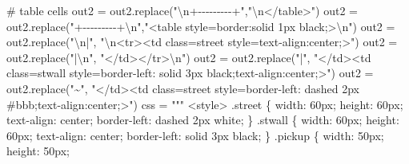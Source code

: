 \documentclass[
  letterpaper,
]{scrbook}
\newenvironment{Shaded}{\begin{snugshade}}{\end{snugshade}}
\newcommand{\CharTok}[1]{\textcolor[rgb]{0.13,0.47,0.30}{#1}}
\newcommand{\CommentTok}[1]{\textcolor[rgb]{0.37,0.37,0.37}{#1}}
\newcommand{\NormalTok}[1]{\textcolor[rgb]{0.00,0.23,0.31}{#1}}
\newcommand{\OperatorTok}[1]{\textcolor[rgb]{0.37,0.37,0.37}{#1}}
\newcommand{\StringTok}[1]{\textcolor[rgb]{0.13,0.47,0.30}{#1}}
\begin{document}
\begin{Shaded}
\begin{Highlighting}[]
    
    \CommentTok{\# table cells}
\NormalTok{    out2 }\OperatorTok{=}\NormalTok{ out2.replace(}\StringTok{"}\CharTok{\textbackslash{}n}\StringTok{+{-}{-}{-}{-}{-}{-}{-}{-}{-}+"}\NormalTok{,}\StringTok{"}\CharTok{\textbackslash{}n}\StringTok{\textless{}/table\textgreater{}"}\NormalTok{)}
\NormalTok{    out2 }\OperatorTok{=}\NormalTok{ out2.replace(}\StringTok{"+{-}{-}{-}{-}{-}{-}{-}{-}{-}+}\CharTok{\textbackslash{}n}\StringTok{"}\NormalTok{,}\StringTok{"\textless{}table style=\textquotesingle{}border:solid 1px black;\textquotesingle{}\textgreater{}}\CharTok{\textbackslash{}n}\StringTok{"}\NormalTok{)}
\NormalTok{    out2 }\OperatorTok{=}\NormalTok{ out2.replace(}\StringTok{"}\CharTok{\textbackslash{}n}\StringTok{|"}\NormalTok{, }\StringTok{"}\CharTok{\textbackslash{}n}\StringTok{\textless{}tr\textgreater{}\textless{}td class=\textquotesingle{}street\textquotesingle{} style=\textquotesingle{}text{-}align:center;\textquotesingle{}\textgreater{}"}\NormalTok{)}
\NormalTok{    out2 }\OperatorTok{=}\NormalTok{ out2.replace(}\StringTok{"|}\CharTok{\textbackslash{}n}\StringTok{"}\NormalTok{, }\StringTok{"\textless{}/td\textgreater{}\textless{}/tr\textgreater{}}\CharTok{\textbackslash{}n}\StringTok{"}\NormalTok{)}
\NormalTok{    out2 }\OperatorTok{=}\NormalTok{ out2.replace(}\StringTok{"|"}\NormalTok{, }\StringTok{"\textless{}/td\textgreater{}\textless{}td class=\textquotesingle{}stwall\textquotesingle{} style=\textquotesingle{}border{-}left: solid 3px black;text{-}align:center;\textquotesingle{}\textgreater{}"}\NormalTok{)}
\NormalTok{    out2 }\OperatorTok{=}\NormalTok{ out2.replace(}\StringTok{"\textasciitilde{}"}\NormalTok{, }\StringTok{"\textless{}/td\textgreater{}\textless{}td class=\textquotesingle{}street\textquotesingle{} style=\textquotesingle{}border{-}left: dashed 2px \#bbb;text{-}align:center;\textquotesingle{}\textgreater{}"}\NormalTok{)}
\NormalTok{    css }\OperatorTok{=} \StringTok{"""}
\StringTok{          \textless{}style\textgreater{}}
\StringTok{            .street \{}
\StringTok{              width: 60px;}
\StringTok{              height: 60px;}
\StringTok{              text{-}align: center;}
\StringTok{              border{-}left: dashed 2px white;}
\StringTok{            \}}
\StringTok{            .stwall \{}
\StringTok{              width: 60px;}
\StringTok{              height: 60px;}
\StringTok{              text{-}align: center;}
\StringTok{                  border{-}left: solid 3px black;}
\StringTok{              \}}
\StringTok{              .pickup \{}
\StringTok{              width: 50px;}
\StringTok{              height: 50px;}

\end{Highlighting}
\end{Shaded}
\end{document}
